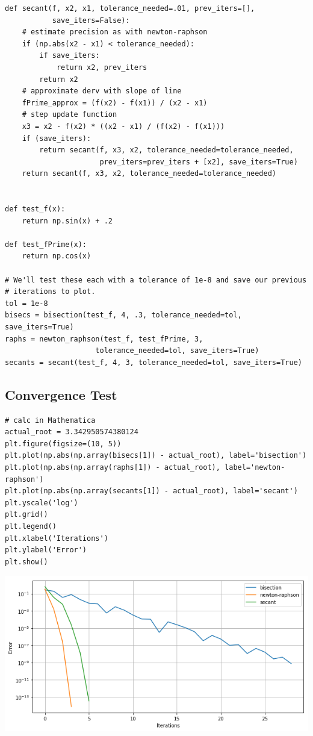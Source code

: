 \documentclass[11pt]{article}
\begin{document}
\begin{verbatim}
def secant(f, x2, x1, tolerance_needed=.01, prev_iters=[], 
           save_iters=False):
    # estimate precision as with newton-raphson
    if (np.abs(x2 - x1) < tolerance_needed):
        if save_iters:
            return x2, prev_iters
        return x2
    # approximate derv with slope of line
    fPrime_approx = (f(x2) - f(x1)) / (x2 - x1)
    # step update function
    x3 = x2 - f(x2) * ((x2 - x1) / (f(x2) - f(x1)))
    if (save_iters):
        return secant(f, x3, x2, tolerance_needed=tolerance_needed,
                      prev_iters=prev_iters + [x2], save_iters=True)
    return secant(f, x3, x2, tolerance_needed=tolerance_needed)
    

def test_f(x):
    return np.sin(x) + .2

def test_fPrime(x):
    return np.cos(x)

# We'll test these each with a tolerance of 1e-8 and save our previous 
# iterations to plot.
tol = 1e-8
bisecs = bisection(test_f, 4, .3, tolerance_needed=tol, save_iters=True)
raphs = newton_raphson(test_f, test_fPrime, 3, 
                     tolerance_needed=tol, save_iters=True)
secants = secant(test_f, 4, 3, tolerance_needed=tol, save_iters=True)
\end{verbatim}

\subsection*{Convergence Test}
\label{sec-2-2}

\begin{verbatim}
# calc in Mathematica
actual_root = 3.342950574380124
plt.figure(figsize=(10, 5))
plt.plot(np.abs(np.array(bisecs[1]) - actual_root), label='bisection')
plt.plot(np.abs(np.array(raphs[1]) - actual_root), label='newton-raphson')
plt.plot(np.abs(np.array(secants[1]) - actual_root), label='secant')
plt.yscale('log')
plt.grid()
plt.legend()
plt.xlabel('Iterations')
plt.ylabel('Error')
plt.show()
\end{verbatim}

\includegraphics[width=.9\linewidth]{./obipy-resources/11275Nal.png}
\end{document}
